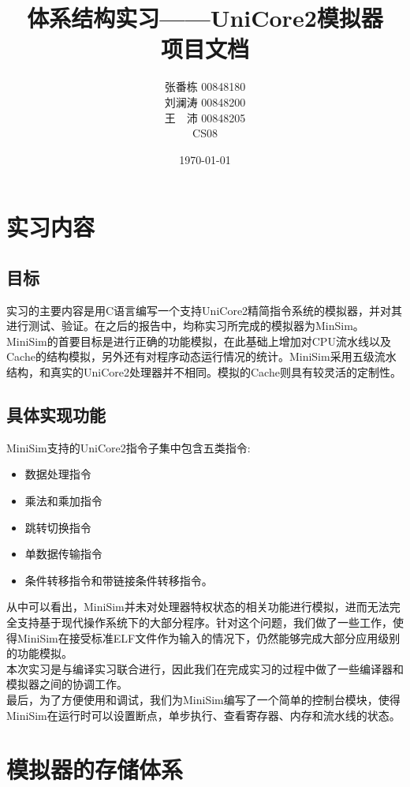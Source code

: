 \documentclass[12pt,a4paper,Flow]{report}
\begin{document}
\title{\textbf{体系结构实习——UniCore2模拟器\\项目文档}}
\author{张番栋 00848180\\刘澜涛 00848200\\王　沛 00848205\\CS08}
\date{\today}
\maketitle
\tableofcontents
\newpage
\chapter{实习内容}
\section{目标}
实习的主要内容是用C语言编写一个支持UniCore2精简指令系统的模拟器，并对其进行测试、验证。在之后的报告中，均称实习所完成的模拟器为MinSim。MiniSim的首要目标是进行正确的功能模拟，在此基础上增加对CPU流水线以及Cache的结构模拟，另外还有对程序动态运行情况的统计。MiniSim采用五级流水结构，和真实的UniCore2处理器并不相同。模拟的Cache则具有较灵活的定制性。\\
\section{具体实现功能}
\indent MiniSim支持的UniCore2指令子集中包含五类指令:
\begin{itemize}
\item 数据处理指令
\item 乘法和乘加指令
\item 跳转切换指令
\item 单数据传输指令
\item 条件转移指令和带链接条件转移指令。
\end{itemize}
\indent 从中可以看出，MiniSim并未对处理器特权状态的相关功能进行模拟，进而无法完全支持基于现代操作系统下的大部分程序。针对这个问题，我们做了一些工作，使得MiniSim在接受标准ELF文件作为输入的情况下，仍然能够完成大部分应用级别的功能模拟。\\
\indent 本次实习是与编译实习联合进行，因此我们在完成实习的过程中做了一些编译器和模拟器之间的协调工作。\\
\indent 最后，为了方便使用和调试，我们为MiniSim编写了一个简单的控制台模块，使得MiniSim在运行时可以设置断点，单步执行、查看寄存器、内存和流水线的状态。
\chapter{模拟器的存储体系}
\end{document}

